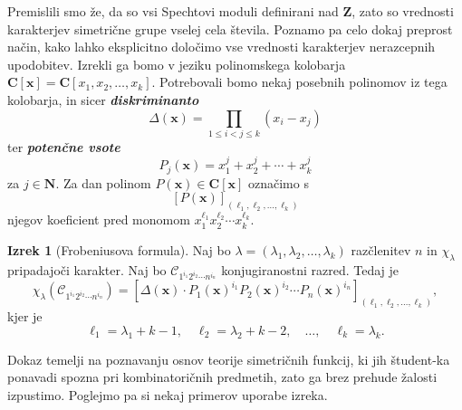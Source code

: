 \documentclass[11pt]{book}
\def\NN{\mathbf{N}}
\def\ZZ{\mathbf{Z}}
\def\CC{\mathbf{C}}
\def\conclass{\mathcal{C}}
\def\definicija{\color{rdeca}\bf\em}
\theoremstyle{definition}
\theoremstyle{zgled}
\theoremstyle{odprtproblem}
\theoremstyle{domacanaloga}
\theoremstyle{izrek}
\newtheorem*{izrek}{Izrek}
\begin{document}
Premislili smo že, da so vsi Spechtovi moduli definirani nad $\ZZ$, zato so vrednosti karakterjev simetrične grupe vselej cela števila. Poznamo pa celo dokaj preprost način, kako lahko eksplicitno določimo vse vrednosti karakterjev nerazcepnih upodobitev. Izrekli ga bomo v jeziku polinomskega kolobarja $\CC[\mathbf{x}] = \CC[x_1, x_2, \dots, x_k]$. Potrebovali bomo nekaj posebnih polinomov iz tega kolobarja, in sicer {\definicija diskriminanto}
\[
    \Delta(\mathbf{x}) = \prod_{1 \leq i < j \leq k} (x_i - x_j)
\]
ter {\definicija potenčne vsote}
\[
    P_j(\mathbf{x}) = x_1^j + x_2^j + \cdots + x_k^j
\]
za $j \in \NN$. Za dan polinom $P(\mathbf{x}) \in \CC[\mathbf{x}]$ označimo s
\[
    [P(\mathbf{x})]_{(\ell_1, \ell_2, \dots, \ell_k)}
\]
njegov koeficient pred monomom $x_1^{\ell_1} x_2^{\ell_2} \cdots x_k^{\ell_k}$.

\begin{izrek}[Frobeniusova formula]
Naj bo $\lambda = (\lambda_1, \lambda_2, \dots, \lambda_k)$ razčlenitev $n$ in $\chi_{\lambda}$ pripadajoči karakter. Naj bo $\conclass_{1^{i_1} 2^{i_2} \cdots n^{i_n}}$ konjugiranostni razred. Tedaj je 
\[
    \chi_{\lambda}\left(\conclass_{1^{i_1} 2^{i_2} \cdots n^{i_n}}\right) =
    \left[ \Delta(\mathbf{x}) \cdot P_1(\mathbf{x})^{i_1} P_2(\mathbf{x})^{i_2} \cdots P_n(\mathbf{x})^{i_n} \right]_{(\ell_1, \ell_2, \dots, \ell_k)},
\]
kjer je
\[
    \ell_1 = \lambda_1 + k - 1, \quad
    \ell_2 = \lambda_2 + k - 2, \quad
    \dots, \quad
    \ell_k = \lambda_k.
\]
\end{izrek}

Dokaz temelji na poznavanju osnov teorije simetričnih funkcij, ki jih študent-ka ponavadi spozna pri kombinatoričnih predmetih, zato ga brez prehude žalosti izpustimo. Poglejmo pa si nekaj primerov uporabe izreka.
\end{document}
